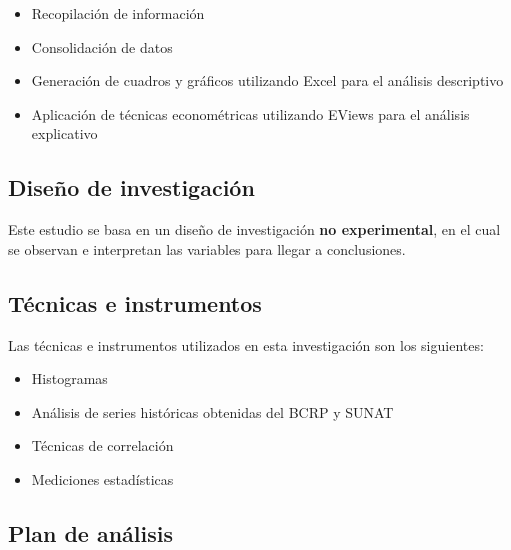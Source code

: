 \documentclass[
  jou,
  floatsintext,
  longtable,
  a4paper,
  nolmodern,
  notxfonts,
  notimes,
  12pt,
  colorlinks=true,linkcolor=blue,citecolor=blue,urlcolor=blue]{apa7}
\providecommand{\tightlist}{%
  \setlength{\itemsep}{0pt}\setlength{\parskip}{0pt}}
\begin{document}
\begin{itemize}
\tightlist
\item
  Recopilación de información
\item
  Consolidación de datos
\item
  Generación de cuadros y gráficos utilizando Excel para el análisis
  descriptivo
\item
  Aplicación de técnicas econométricas utilizando EViews para el
  análisis explicativo
\end{itemize}

\subsection{Diseño de
investigación}\label{diseuxf1o-de-investigaciuxf3n}

Este estudio se basa en un diseño de investigación \textbf{no
experimental}, en el cual se observan e interpretan las variables para
llegar a conclusiones.

\subsection{Técnicas e instrumentos}\label{tuxe9cnicas-e-instrumentos}

Las técnicas e instrumentos utilizados en esta investigación son los
siguientes:

\begin{itemize}
\tightlist
\item
  Histogramas
\item
  Análisis de series históricas obtenidas del BCRP y SUNAT
\item
  Técnicas de correlación
\item
  Mediciones estadísticas
\end{itemize}

\subsection{Plan de análisis}\label{plan-de-anuxe1lisis}
\end{document}
